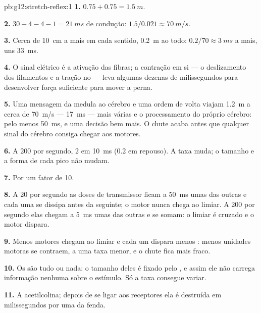 \begin{solution}{pb:g12:stretch-reflex:1}
\textbf{1.} $0.75 + 0.75 = \qty{1.5}{m}$.

\textbf{2.} $30 - 4 - 4 - 1 = \qty{21}{ms}$ de condução: $1.5/0.021
\approx \qty{70}{m/s}$.

\textbf{3.} Cerca de \qty{10}{cm} a mais em cada sentido, \qty{0.2}{m}
ao todo: $0.2/70 \approx \qty{3}{ms}$ a mais, uns \qty{33}{ms}.

\textbf{4.} O sinal elétrico é a ativação das fibras; a contração em si
--- o deslizamento dos filamentos e a tração no  --- leva algumas
dezenas de milissegundos para desenvolver força suficiente para mover a perna.

\textbf{5.} Uma mensagem da medula ao cérebro e uma ordem de volta
viajam \qty{1.2}{m} a cerca de \qty{70}{m/s} --- \qty{17}{ms} --- mais
várias  e o processamento do próprio cérebro: pelo menos
\qty{50}{ms}, e uma decisão bem mais. O chute acaba antes que qualquer
sinal do cérebro consiga chegar aos  motores.

\textbf{6.} A 200 por segundo, 2  em \qty{10}{ms}
(0.2 em repouso). A taxa muda; o tamanho e a forma de cada pico não mudam.

\textbf{7.} Por um fator de 10.

\textbf{8.} A 20 por segundo as doses de transmissor ficam a
\qty{50}{ms} umas das outras e cada uma se dissipa antes da seguinte; o
 motor nunca chega ao limiar. A 200 por segundo elas chegam a
\qty{5}{ms} umas das outras e se somam: o limiar é cruzado e o 
motor dispara.

\textbf{9.} Menos  motores chegam ao limiar e cada um dispara
menos : menos unidades motoras se contraem, a uma
taxa menor, e o chute fica mais fraco.

\textbf{10.} Os  são tudo ou nada: o tamanho deles é
fixado pelo , e assim ele não carrega informação nenhuma sobre
o estímulo. Só a taxa consegue variar.

\textbf{11.} A acetilcolina; depois de se ligar aos receptores ela é
destruída em milissegundos por uma  da fenda.


\end{solution}
